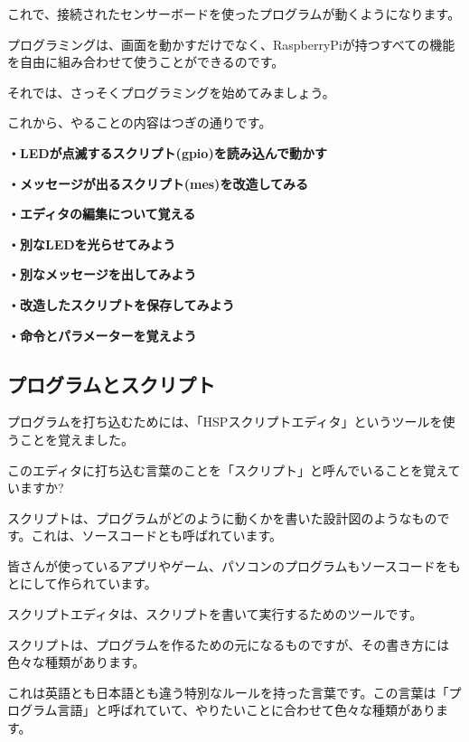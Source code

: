 \documentclass[a4paper,12pt]{jarticle}
\begin{document}
\bigskip
\bigskip
\bigskip

これで、接続されたセンサーボードを使ったプログラムが動くようになります。

プログラミングは、画面を動かすだけでなく、RaspberryPiが持つすべての機能を自由に組み合わせて使うことができるのです。

\bigskip

それでは、さっそくプログラミングを始めてみましょう。

これから、やることの内容はつぎの通りです。


\bigskip

{\bfseries
・LEDが点滅するスクリプト(gpio)を読み込んで動かす}

{\bfseries
・メッセージが出るスクリプト(mes)を改造してみる}

{\bfseries
・エディタの編集について覚える}

{\bfseries
・別なLEDを光らせてみよう}

{\bfseries
・別なメッセージを出してみよう}

{\bfseries
・改造したスクリプトを保存してみよう}

{\bfseries
・命令とパラメーターを覚えよう}


\clearpage
\subsection{プログラムとスクリプト}
\bigskip
\bigskip

プログラムを打ち込むためには、「HSPスクリプトエディタ」というツールを使うことを覚えました。

このエディタに打ち込む言葉のことを「スクリプト」と呼んでいることを覚えていますか?

スクリプトは、プログラムがどのように動くかを書いた設計図のようなものです。これは、ソースコードとも呼ばれています。

皆さんが使っているアプリやゲーム、パソコンのプログラムもソースコードをもとにして作られています。

スクリプトエディタは、スクリプトを書いて実行するためのツールです。


\bigskip


\bigskip

スクリプトは、プログラムを作るための元になるものですが、その書き方には色々な種類があります。

これは英語とも日本語とも違う特別なルールを持った言葉です。この言葉は「プログラム言語」と呼ばれていて、やりたいことに合わせて色々な種類があります。

\bigskip
\bigskip
\end{document}
